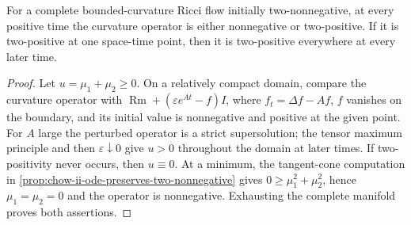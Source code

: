 \begin{proposition}
  \label{prop:chow-ii-strong-two-nonnegative-alternative}
  For a complete bounded-curvature Ricci flow initially two-nonnegative, at
  every positive time the curvature operator is either nonnegative or
  two-positive.  If it is two-positive at one space-time point, then it is
  two-positive everywhere at every later time.
\end{proposition}
\begin{proof}
\sketch
  Let \(u=\mu_1+\mu_2\ge0\).  On a relatively compact domain, compare the
  curvature operator with
  \(\operatorname{Rm}+(\varepsilon e^{At}-f)I\), where
  \(f_t=\Delta f-Af\), \(f\) vanishes on the boundary, and its initial value
  is nonnegative and positive at the given point.  For \(A\) large the
  perturbed operator is a strict supersolution; the tensor maximum principle
  and then \(\varepsilon\downarrow0\) give \(u>0\) throughout the domain at
  later times.  If two-positivity never occurs, then \(u\equiv0\).  At a
  minimum, the tangent-cone computation in
  \ref{prop:chow-ii-ode-preserves-two-nonnegative} gives
  \(0\ge\mu_1^2+\mu_2^2\), hence \(\mu_1=\mu_2=0\) and the operator is
  nonnegative.  Exhausting the complete manifold proves both assertions.
\end{proof}

